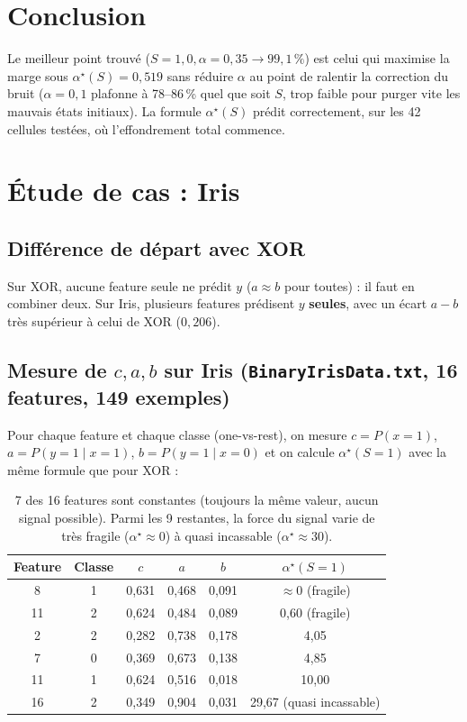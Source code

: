 \documentclass[12pt,a4paper]{article}
\theoremstyle{remark}
\begin{document}
\section{Conclusion}

Le meilleur point trouvé ($S{=}1{,}0,\alpha{=}0{,}35\to99{,}1\,\%$) est celui qui
maximise la marge sous $\alpha^\star(S)=0{,}519$ sans réduire $\alpha$ au point de
ralentir la correction du bruit ($\alpha=0{,}1$ plafonne à 78--86\,\% quel que
soit $S$, trop faible pour purger vite les mauvais états initiaux). La formule
$\alpha^\star(S)$ prédit correctement, sur les 42 cellules testées, où
l'effondrement total commence.

\section{Étude de cas : Iris}

\subsection{Différence de départ avec XOR}

Sur XOR, aucune feature seule ne prédit $y$ ($a\approx b$ pour toutes) : il faut
en combiner deux. Sur Iris, plusieurs features prédisent $y$ \textbf{seules},
avec un écart $a-b$ très supérieur à celui de XOR ($0{,}206$).

\subsection{Mesure de $c,a,b$ sur Iris (\texttt{BinaryIrisData.txt}, 16 features, 149 exemples)}

Pour chaque feature et chaque classe (one-vs-rest), on mesure $c=P(x{=}1)$,
$a=P(y{=}1\mid x{=}1)$, $b=P(y{=}1\mid x{=}0)$ et on calcule $\alpha^\star(S{=}1)$
avec la même formule que pour XOR :

\begin{table}[h]
\centering
\renewcommand{\arraystretch}{1.2}
\begin{tabular}{cccccc}
\toprule
Feature & Classe & $c$ & $a$ & $b$ & $\alpha^\star(S{=}1)$ \\
\midrule
8  & 1 & 0,631 & 0,468 & 0,091 & $\approx0$ (fragile) \\
11 & 2 & 0,624 & 0,484 & 0,089 & 0,60 (fragile) \\
2  & 2 & 0,282 & 0,738 & 0,178 & 4,05 \\
7  & 0 & 0,369 & 0,673 & 0,138 & 4,85 \\
11 & 1 & 0,624 & 0,516 & 0,018 & 10,00 \\
16 & 2 & 0,349 & 0,904 & 0,031 & 29,67 (quasi incassable) \\
\bottomrule
\end{tabular}
\caption{7 des 16 features sont constantes (toujours la même valeur, aucun
signal possible). Parmi les 9 restantes, la force du signal varie de très
fragile ($\alpha^\star\approx0$) à quasi incassable ($\alpha^\star\approx30$).}
\end{table}
\end{document}
